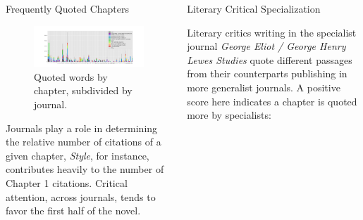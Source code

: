 \documentclass[final]{beamer}
\newlength{\onecolwid}
\newlength{\twocolwid}
\begin{document}
\begin{frame}[t]
\begin{columns}[t]
\begin{column}{\twocolwid}
\begin{columns}[t,totalwidth=\twocolwid]
\begin{column}{\onecolwid}

\begin{block}{Frequently Quoted Chapters}

\begin{figure}
\includegraphics[width=0.9\linewidth]{synchronic-journals.png}
\caption{Quoted words by chapter, subdivided by journal.}
\end{figure}

Journals play a role in determining the relative number of citations of a given chapter, \emph{Style}, for instance, contributes heavily to the number of Chapter 1 citations.  Critical attention, across journals, tends to favor the first half of the novel.

\end{block}


\end{column} %

\begin{column}{\onecolwid}\vspace{-.6in} %


\begin{block}{Literary Critical Specialization}

Literary critics writing in the specialist journal \emph{George Eliot / George Henry Lewes Studies} quote different passages from their counterparts publishing in more generalist journals. A positive score here indicates a chapter is quoted more by specialists:  


\end{block}
\end{column}
\end{columns}
\end{column}
\end{columns}
\end{frame}
\end{document}
